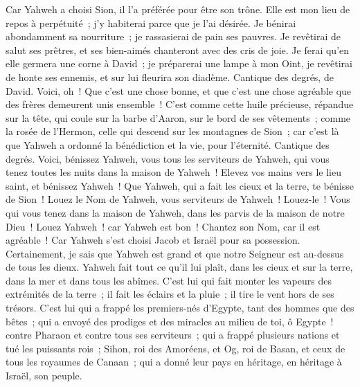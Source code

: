 \begin{multicols}{2}
Car Yahweh a choisi Sion, il l'a préférée pour être son trône.
Elle est mon lieu de repos à perpétuité~; j'y habiterai parce que je l'ai désirée.
Je bénirai abondamment sa nourriture~; je rassasierai de pain ses pauvres.
Je revêtirai de salut ses prêtres, et ses bien-aimés chanteront avec des cris de joie.
Je ferai qu'en elle germera une corne à David~; je préparerai une lampe à mon Oint,
je revêtirai de honte ses ennemis, et sur lui fleurira son diadème.
\VerseOne{}Cantique des degrés, de David. Voici, oh~! Que c'est une chose bonne, et que c'est une chose agréable que des frères demeurent unis ensemble~!
C'est comme cette huile précieuse, répandue sur la tête, qui coule sur la barbe d'Aaron, sur le bord de ses vêtements~;
comme la rosée de l'Hermon, celle qui descend sur les montagnes de Sion~; car c'est là que Yahweh a ordonné la bénédiction et la vie, pour l'éternité.
\VerseOne{}Cantique des degrés. Voici, bénissez Yahweh, vous tous les serviteurs de Yahweh, qui vous tenez toutes les nuits dans la maison de Yahweh~!
Elevez vos mains vers le lieu saint, et bénissez Yahweh~!
Que Yahweh, qui a fait les cieux et la terre, te bénisse de Sion~!
\VerseOne{}Louez le Nom de Yahweh, vous serviteurs de Yahweh~! Louez-le~!
Vous qui vous tenez dans la maison de Yahweh, dans les parvis de la maison de notre Dieu~!
Louez Yahweh~! car Yahweh est bon~! Chantez son Nom, car il est agréable~!
Car Yahweh s'est choisi Jacob et Israël pour sa possession.
Certainement, je sais que Yahweh est grand et que notre Seigneur est au-dessus de tous les dieux.
Yahweh fait tout ce qu'il lui plaît, dans les cieux et sur la terre, dans la mer et dans tous les abîmes.
C'est lui qui fait monter les vapeurs des extrémités de la terre~; il fait les éclairs et la pluie~; il tire le vent hors de ses trésors.
C'est lui qui a frappé les premiers-nés d'Egypte, tant des hommes que des bêtes~;
qui a envoyé des prodiges et des miracles au milieu de toi, ô Egypte~! contre Pharaon et contre tous ses serviteurs~;
qui a frappé plusieurs nations et tué les puissants rois~;
Sihon, roi des Amoréens, et Og, roi de Basan, et ceux de tous les royaumes de Canaan~;
qui a donné leur pays en héritage, en héritage à Israël, son peuple.

\end{multicols}
